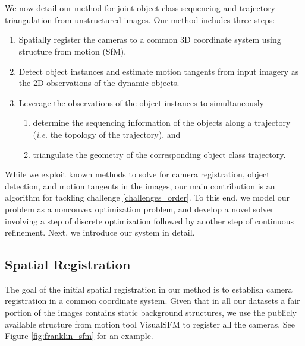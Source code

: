 \section{\JOST}

We now detail our method for joint object class sequencing and trajectory triangulation from unstructured images. 
Our method includes three steps:
\begin{enumerate}
\item \label{challenges_sfm} Spatially register the cameras to a common 3D coordinate system using structure from motion (SfM).
\item \label{challenges_tang} Detect object instances and estimate motion tangents from input imagery as the 2D observations of the dynamic objects.
\item \label{challenges_order} Leverage the observations of the object instances to simultaneously
\begin{enumerate}
\item determine the sequencing information of the objects along a trajectory (\emph{i.e}. the topology of the trajectory), and
\item triangulate the geometry of the corresponding object class trajectory.
\end{enumerate}

\end{enumerate}
While we exploit known methods to solve for camera registration, object detection, and motion tangents in the images, our main contribution is an algorithm for tackling challenge  \ref{challenges_order}. To this end, we model our problem as a nonconvex optimization problem, and develop a novel solver involving a step of discrete optimization followed by another step of continuous refinement. 
Next, we introduce our system in detail.

\subsection{Spatial Registration}
The goal of the initial spatial registration in our method is to establish camera registration in a common coordinate system.
Given that in all our datasets a fair portion of the images contains static background structures, we use the publicly available structure from motion tool VisualSFM  \cite{WuVSFM} to register all the cameras. See Figure \ref{fig:franklin_sfm} for an example.

